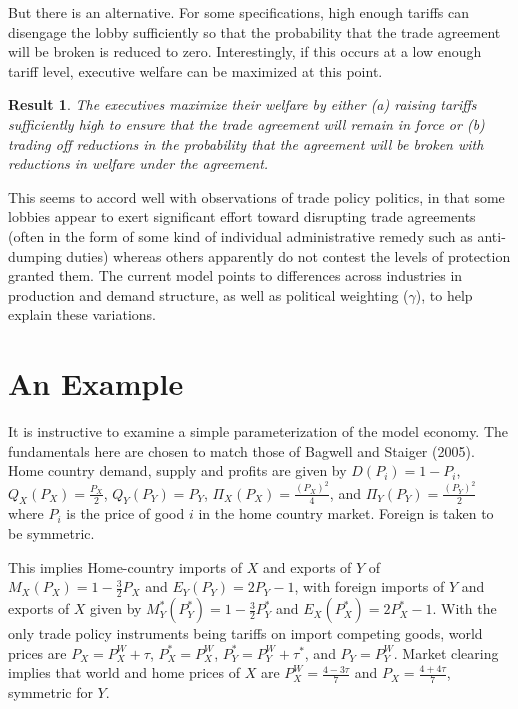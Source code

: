 \documentclass[10pt]{article}
\newtheorem{result}{Result}
\newcommand{\ga}{\gamma}
\begin{document}
But there is an alternative. For some specifications, high enough tariffs can disengage the lobby sufficiently so that the probability that the trade agreement will be broken is reduced to zero. Interestingly, if this occurs at a low enough tariff level, executive welfare can be maximized at this point. 
\begin{result}
  The executives maximize their welfare by either (a) raising tariffs sufficiently high to ensure that the trade agreement will remain in force or (b) trading off reductions in the probability that the agreement will be broken with reductions in welfare under the agreement.
  \label{res:execsoln}
\end{result}
This seems to accord well with observations of trade policy politics, in that some lobbies appear to exert significant effort toward disrupting trade agreements (often in the form of some kind of individual administrative remedy such as anti-dumping duties) whereas others apparently do not contest the levels of protection granted them. The current model points to differences across industries in production and demand structure, as well as political weighting ($\ga$), to help explain these variations.


\section{An Example}
\label{sec:example}
It is instructive to examine a simple parameterization of the model economy. The fundamentals here are chosen to match those of Bagwell and Staiger (2005). Home country demand, supply and profits are given by $D(P_i) = 1 - P_i$, $Q_X(P_X) = \frac{P_X}{2}$, $Q_Y(P_Y) = P_Y$, $\Pi_X(P_X) = \frac{(P_X)^2}{4}$, and $\Pi_Y(P_Y) = \frac{(P_Y)^2}{2}$ where $P_i$ is the price of good $i$ in the home country market. %
Foreign is taken to be symmetric.

This implies Home-country imports of $X$ and exports of $Y$ of $M_X(P_X)= 1 - \frac{3}{2}P_X$ and $E_Y(P_Y)= 2P_Y -1$, with foreign imports of $Y$ and exports of $X$ given by $M_Y^*(P_Y^*)= 1 - \frac{3}{2}P_Y^*$ and $E_X(P_X^*)= 2P_X^* -1$. With the only trade policy instruments being tariffs on import competing goods, world prices are $P_X = P_X^W + \tau$, $P_X^* = P_X^W$, $P_Y^* = P_Y^W + \tau^*$, and $P_Y = P_Y^W$. Market clearing implies that world and home prices of $X$ are $P_X^W = \frac{4-3\tau}{7}$ and $P_X = \frac{4+4\tau}{7}$, symmetric for $Y$. \\
\end{document}
